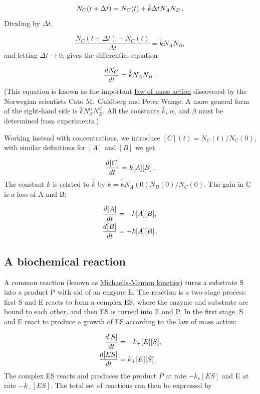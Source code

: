 \documentclass[%
oneside,                 %
final,                   %
10pt]{article}
\begin{document}
\[ N_C(t+\Delta t) = N_C(t) + \hat k\Delta t N_AN_B\tp\]
Dividing by $\Delta t$,

\[ \frac{N_C(t+\Delta t) - N_C(t)}{\Delta t} = \hat k N_AN_B,\]
and letting $\Delta t\rightarrow 0$, gives the differential equation

\[ \frac{dN_C}{dt} = \hat k N_AN_B\tp\]
(This equation is known as the important \href{{https://en.wikipedia.org/wiki/Law_of_mass_action}}{law of mass action} discovered by
the Norwegian scientists Cato M.~Guldberg and Peter Waage.
A more general form of the right-hand side is $\hat kN_A^{\alpha}N_B^{\beta}$.
All the constants $\hat k$, $\alpha$, and $\beta$ must be determined from
experiments.)

Working instead with concentrations, we introduce $[C](t)=N_C(t)/N_C(0)$,
with similar definitions for $[A]$ and $[B]$ we get

\begin{equation}
\frac{d[C]}{dt} = k [A][B]\tp
\end{equation}
The constant $k$ is related to $\hat k$ by $k = \hat k N_A(0)N_B(0)/N_C(0)$.
The gain in C is a loss of A and B:

\begin{align}
\frac{d[A]}{dt} &= -k[A][B],\\ 
\frac{d[B]}{dt} &= -k[A][B]\tp
\end{align}

\subsection{A biochemical reaction}

A common reaction (known as \href{{https://en.wikipedia.org/wiki/Michaelis-Menten_kinetics}}{Michaelis-Menton kinetics}) turns a substrate S into
a product P with aid of an enzyme E. The reaction is a two-stage process:
first S and E reacts to form a complex ES, where the enzyme and substrate
are bound to each other, and then ES is turned into E and P.
In the first stage, S and E react to produce a growth of ES according
to the law of mass action:

\begin{align*}
\frac{d[S]}{dt} &= - k_+[E][S],\\ 
\frac{d[ES]}{dt} &= k_+[E][S]\tp\\ 
\end{align*}
The complex ES reacts and produces the product $P$ at rate
$-k_{v}[ES]$ and E at rate $-k_-[ES]$. The total set of reactions can
then be expressed by
\end{document}
